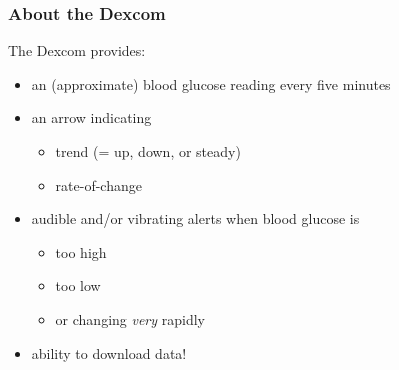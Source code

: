 \documentclass{beamer}
\begin{document}

\begin{frame}
  \frametitle{About the Dexcom}

  The Dexcom provides:
    \begin{itemize}
    \item an (approximate) blood glucose reading every five minutes
    \item an arrow indicating
    \begin{itemize}
    \item trend (= up, down, or steady)
    \item rate-of-change
    \end{itemize}
    \item audible and/or vibrating alerts when blood glucose is
      \begin{itemize}
      \item too high
      \item too low
      \item or changing \textit{very} rapidly
      \end{itemize}
    \item ability to download data!
    \end{itemize}
\end{frame}
\end{document}

